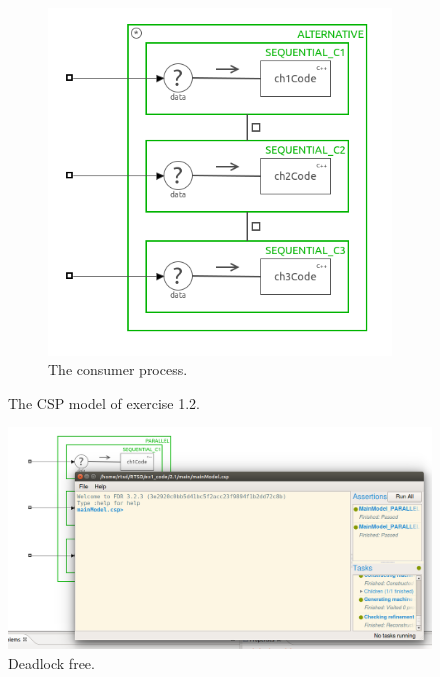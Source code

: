\documentclass[a4paper,twoside,11pt]{article}
\begin{document}
\begin{figure}
\begin{subfigure}{0.5\textwidth}
		\includegraphics[width=\textwidth]{./images/2-1_consumer.png}
		\caption{The consumer process.}
		\label{fig:2_1-model:consumer}
	\end{subfigure}
	\caption{The CSP model of exercise 1.2.}
	\label{fig:2_1-model}
\end{figure}


\begin{figure}
	\centering
	\includegraphics[width=\textwidth]{./images/2-1_fdr.png}
	\caption{Deadlock free.}
	\label{fig:2_1_DF}
\end{figure}
\end{document}
